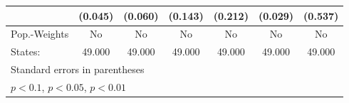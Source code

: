 {\begin{tabular}{l*{6}{c}}
            &     (0.045)         &     (0.060)         &     (0.143)         &     (0.212)         &     (0.029)         &     (0.537)         \\
\hline
Pop.-Weights&          No         &          No         &          No         &          No         &          No         &          No         \\
States:     &      49.000         &      49.000         &      49.000         &      49.000         &      49.000         &      49.000         \\
\hline\hline
\multicolumn{7}{l}{\footnotesize Standard errors in parentheses}\\
\multicolumn{7}{l}{\footnotesize \sym{*} \(p<0.1\), \sym{**} \(p<0.05\), \sym{***} \(p<0.01\)}\\
\end{tabular}
}
